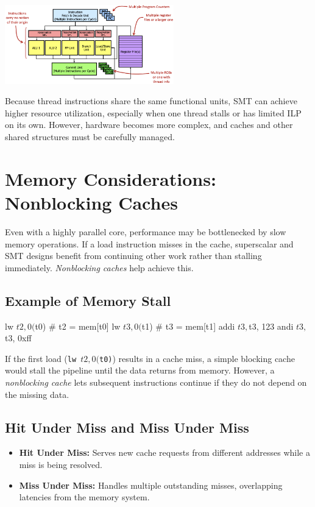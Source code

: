 \begin{center}
    \includegraphics[width=0.55\textwidth]{chapters/chapter4f/images/smt_proc.png}
\end{center}

Because thread instructions share the same functional units, SMT can achieve higher resource utilization, especially when one thread stalls or has limited ILP on its own. However, hardware becomes more complex, and caches and other shared structures must be carefully managed.

\section{Memory Considerations: Nonblocking Caches}
Even with a highly parallel core, performance may be bottlenecked by slow memory operations. If a load instruction misses in the cache, superscalar and SMT designs benefit from continuing other work rather than stalling immediately. \emph{Nonblocking caches} help achieve this.

\subsection*{Example of Memory Stall}
\begin{assembly}
lw   $t2, 0($t0)    # t2 = mem[t0]
lw   $t3, 0($t1)    # t3 = mem[t1]
addi $t3, $t3, 123
andi $t3, $t3, 0xff
\end{assembly}
If the first load (\texttt{lw $t2, 0($t0)}) results in a cache miss, a simple blocking cache would stall the pipeline until the data returns from memory. However, a \emph{nonblocking cache} lets subsequent instructions continue if they do not depend on the missing data.

\subsection*{Hit Under Miss and Miss Under Miss}
\begin{itemize}
  \item \textbf{Hit Under Miss:} Serves new cache requests from different addresses while a miss is being resolved.
  \item \textbf{Miss Under Miss:} Handles multiple outstanding misses, overlapping latencies from the memory system.
\end{itemize}

